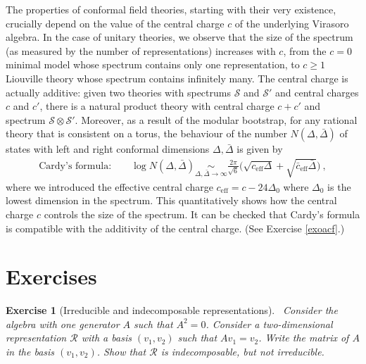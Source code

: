 \documentclass[12pt, a4paper, notitlepage, twoside]{report}
\numberwithin{equation}{section}
\theoremstyle{break}
\newtheorem{exo}{Exercise}[chapter]
\begin{document}
The properties of conformal field theories, starting with their very existence, crucially depend on the value of the central charge $c$ of the underlying Virasoro algebra.
In the case of unitary theories, we observe that the size of the spectrum (as measured by the number of representations) increases with $c$, from the $c=0$ minimal model whose spectrum contains only one representation, to $c\geq 1$ Liouville theory whose spectrum contains infinitely many.
The central charge is actually additive: given two theories with spectrums $\mathcal{S}$ and $\mathcal{S}'$ and central charges $c$ and $c'$, there is a natural product theory with central charge $c+c'$ and spectrum $\mathcal{S}\otimes \mathcal{S}'$.
Moreover, as a result of the modular bootstrap, for any rational theory that is consistent on a torus, 
the behaviour of the number $N(\Delta,\bar{\Delta})$ of states with left and right conformal dimensions $\Delta,\bar{\Delta}$ is given by 
\begin{align}
\text{Cardy's formula:} \qquad \log N(\Delta,\bar{\Delta}) \underset{\Delta,\bar{\Delta}\to \infty}{\sim} \frac{2\pi}{\sqrt{6}} \Big(\sqrt{c_\text{eff} \Delta} + \sqrt{\bar c_\text{eff} \bar\Delta}\Big)\ ,
\label{nds}
\end{align}
where we introduced the effective central charge $c_\text{eff}=c-24\Delta_0$ where $\Delta_0$ is the lowest dimension in the spectrum.
This quantitatively shows how the central charge $c$ controls the size of the spectrum.
It can be checked that Cardy's formula is compatible with the additivity of the central charge. (See Exercise \ref{exoacf}.)

\section{Exercises}


\begin{exo}[Irreducible and indecomposable representations] 
~\label{exoirr}
Consider the algebra with one generator $A$ such that $A^2 = 0$.
Consider a two-dimensional representation $\mathcal{R}$ with a basis $(v_1,v_2)$ such that $Av_1=v_2$.
Write the matrix of $A$ in the basis $(v_1,v_2)$.
Show that $\mathcal{R}$ is indecomposable, but not irreducible. 
\end{exo}
\end{document}
